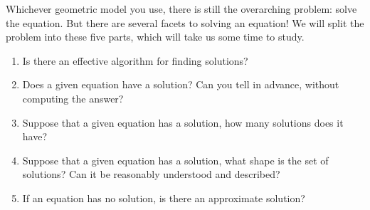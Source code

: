 \documentclass[00-livre-main.tex]{subfiles}
\begin{document}
Whichever geometric model you use, there is still the overarching problem: solve the 
equation. But there are several facets to solving an equation! We will split the
problem into these five parts, which will take us some time to study.


\begin{enumerate}
	\item Is there an effective algorithm for finding solutions?
	\item Does a given equation have a solution? Can you tell in advance, without computing the answer?
	\item Suppose that a given equation has a solution, how many solutions does it have?
	\item Suppose that a given equation has a solution, what shape is the set of solutions? Can it be reasonably understood and described?
	\item If an equation has no solution, is there an approximate solution?	
\end{enumerate}
\end{document}
